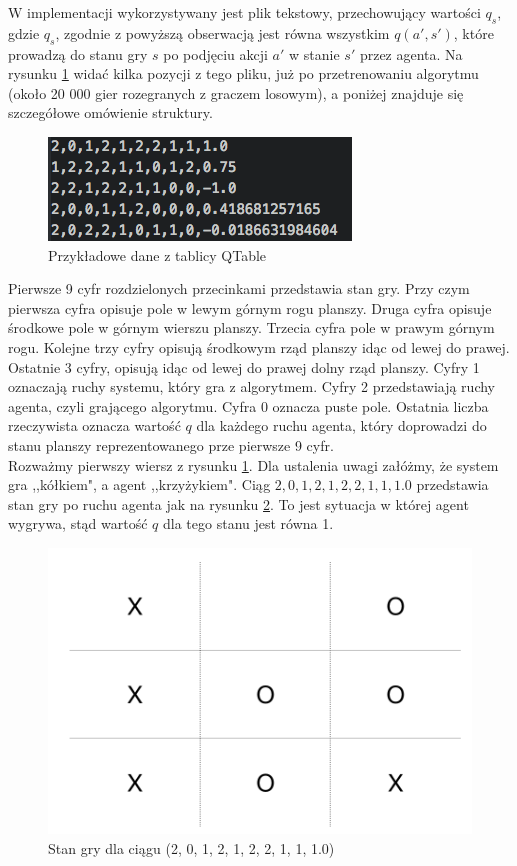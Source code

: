 \documentclass[licencjacka]{pracamgr}
\begin{document}
W implementacji wykorzystywany jest plik tekstowy, przechowujący wartości $q_{s}$, gdzie $q_{s}$, zgodnie z powyższą obserwacją jest równa wszystkim  $q(a',s')$, które prowadzą do stanu gry $s$ po podjęciu akcji $a'$ w stanie $s'$ przez agenta. Na rysunku \ref{Rys8} widać kilka pozycji z tego pliku, już po przetrenowaniu algorytmu (około 20 000 gier rozegranych z graczem losowym), a poniżej znajduje się szczegółowe omówienie struktury.


\begin{figure}[h!]
	\includegraphics [scale=0.8] {QTable_ex.png}
	\caption{Przykładowe dane z tablicy QTable}
	\label{Rys8}
\end{figure}

Pierwsze 9 cyfr rozdzielonych przecinkami przedstawia stan gry. Przy czym pierwsza cyfra opisuje pole w lewym górnym rogu planszy. Druga cyfra opisuje środkowe pole w górnym wierszu planszy. Trzecia cyfra pole w prawym górnym rogu. Kolejne trzy cyfry opisują środkowym rząd planszy idąc od lewej do prawej. Ostatnie 3 cyfry, opisują idąc od lewej do prawej dolny rząd planszy.  Cyfry 1 oznaczają ruchy systemu, który gra z algorytmem. Cyfry 2 przedstawiają ruchy agenta, czyli grającego algorytmu. Cyfra 0 oznacza puste pole. Ostatnia liczba rzeczywista oznacza wartość  $q$ dla każdego ruchu agenta, który doprowadzi do stanu planszy reprezentowanego prze pierwsze 9 cyfr.\\ 

Rozważmy pierwszy wiersz z rysunku \ref{Rys8}. Dla ustalenia uwagi załóżmy, że system gra ,,kółkiem", a agent ,,krzyżykiem". Ciąg $2, 0, 1, 2, 1, 2,  2, 1, 1, 1.0$ przedstawia stan gry po ruchu agenta jak na rysunku \ref{Rys9}. To jest sytuacja w której agent wygrywa, stąd wartość $q$ dla tego stanu jest równa 1. 

\begin{figure}[h!]
	\includegraphics [scale=0.22] {ttt_1.png}
	\caption{Stan gry dla ciągu (2, 0, 1, 2, 1, 2,  2, 1, 1, 1.0)}
	\label{Rys9}
\end{figure}
\end{document}
